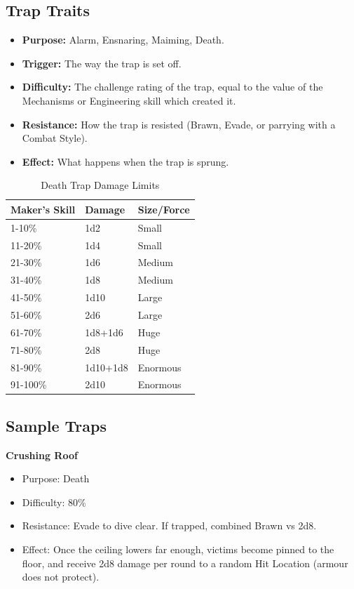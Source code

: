 \documentclass[10pt]{article}
\begin{document}
\subsection{Trap Traits}
\begin{itemize}[leftmargin=*]
    \item \textbf{Purpose:} Alarm, Ensnaring, Maiming, Death.
    \item \textbf{Trigger:} The way the trap is set off.
    \item \textbf{Difficulty:} The challenge rating of the trap, equal to the value of the Mechanisms or Engineering skill which created it.
    \item \textbf{Resistance:} How the trap is resisted (Brawn, Evade, or parrying with a Combat Style).
    \item \textbf{Effect:} What happens when the trap is sprung.
\end{itemize}

\begin{table}[h]
\centering
\caption{Death Trap Damage Limits}
\label{tab:trap-damage}
\begin{tabular}{lll}
\toprule
\textbf{Maker's Skill} & \textbf{Damage} & \textbf{Size/Force} \\
\midrule
1-10\% & 1d2 & Small \\
11-20\% & 1d4 & Small \\
21-30\% & 1d6 & Medium \\
31-40\% & 1d8 & Medium \\
41-50\% & 1d10 & Large \\
51-60\% & 2d6 & Large \\
61-70\% & 1d8+1d6 & Huge \\
71-80\% & 2d8 & Huge \\
81-90\% & 1d10+1d8 & Enormous \\
91-100\% & 2d10 & Enormous \\
\bottomrule
\end{tabular}
\end{table}

\subsection{Sample Traps}
\label{sec:sample-traps}
\textbf{Crushing Roof}
\begin{itemize}[leftmargin=*]
    \item Purpose: Death
    \item Difficulty: 80\%
    \item Resistance: Evade to dive clear. If trapped, combined Brawn vs 2d8.
    \item Effect: Once the ceiling lowers far enough, victims become pinned to the floor, and receive 2d8 damage per round to a random Hit Location (armour does not protect).
\end{itemize}
\end{document}
